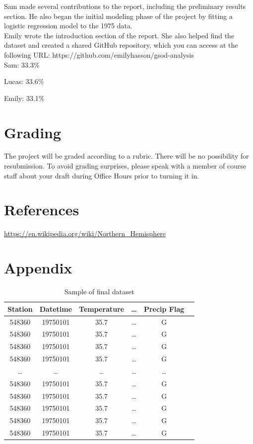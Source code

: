 \documentclass[conference]{IEEEtran}
\begin{document}
Sam made several contributions to the report, including the preliminary results section. He also began the initial modeling phase of the project by fitting a logistic regression model to the 1975 data. \\

Emily wrote the introduction section of the report. She also helped find the dataset and created a shared GitHub repository, which you can access at the following URL: https://github.com/emilyhasson/gsod-analysis \\

Sam: 33.3\%

Lucas: 33.6\%

Emily: 33.1\%

\section{Grading}

The project will be graded according to a rubric. There will be no possibility for resubmission. To avoid grading surprises, please speak with a member of course staff about your draft during Office Hours prior to turning it in.

\section{References}

\href{https://en.wikipedia.org/wiki/Northern_Hemisphere}{https://en.wikipedia.org/wiki/Northern\_Hemisphere}

\section{Appendix}

\begin{table}[h!]
\centering
 \begin{tabular}{||c c c c c c||}
 \hline
  Station& Datetime &Temperature & \dots & Precip Flag \\ [0.5ex]
 \hline\hline
 548360 & 19750101 & 35.7 & \dots & G \\
 548360 & 19750101 & 35.7 & \dots & G \\
 548360 & 19750101 & 35.7 & \dots & G \\
 548360 & 19750101 & 35.7 & \dots & G \\
 \dots & \dots & \dots & \dots & \dots \\
 548360 & 19750101 & 35.7 & \dots & G \\
 548360 & 19750101 & 35.7 & \dots & G \\
 548360 & 19750101 & 35.7 & \dots & G \\
 548360 & 19750101 & 35.7 & \dots & G \\
 548360 & 19750101 & 35.7 & \dots & G \\[1ex]

 \hline
 \end{tabular}
 \caption{Sample of final dataset}
\end{table}
\end{document}
